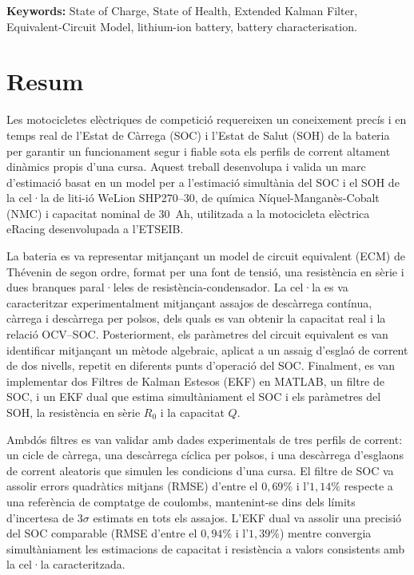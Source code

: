 \begin{sloppy}
\vspace{1em}
\noindent\textbf{Keywords:} State of Charge, State of Health, Extended Kalman Filter, 
Equivalent-Circuit Model, lithium-ion battery, battery characterisation.


\end{sloppy}

\chapter*{Resum}
Les motocicletes elèctriques de competició requereixen un coneixement precís i en 
temps real de l'Estat de Càrrega (SOC) i l'Estat de Salut (SOH) de la bateria per 
garantir un funcionament segur i fiable sota els perfils de corrent altament dinàmics 
propis d'una cursa. Aquest treball desenvolupa i valida un marc d'estimació basat en un 
model per a l'estimació simultània del SOC i el SOH de la cel·la de liti-ió WeLion 
SHP270--30, de química Níquel-Manganès-Cobalt (NMC) i capacitat nominal de 30~Ah, 
utilitzada a la motocicleta elèctrica eRacing desenvolupada a l'ETSEIB.

La bateria es va representar mitjançant un model de circuit equivalent (ECM) de 
Thévenin de segon ordre, format per una font de tensió, una resistència en sèrie i 
dues branques paral·leles de resistència-condensador. La cel·la es va caracteritzar 
experimentalment mitjançant assajos de descàrrega contínua, càrrega i descàrrega per polsos, 
dels quals es van obtenir la capacitat real i la relació OCV--SOC. Posteriorment, els 
paràmetres del circuit equivalent es van identificar mitjançant un mètode algebraic, 
aplicat a un assaig d'esglaó de corrent de dos nivells, repetit en diferents punts 
d'operació del SOC. Finalment, es van implementar dos Filtres de Kalman Estesos (EKF) 
en MATLAB, un filtre de SOC, i un EKF dual que estima simultàniament el SOC i els 
paràmetres del SOH, la resistència en sèrie $R_0$ i la capacitat $Q$.

Ambdós filtres es van validar amb dades experimentals de tres perfils de corrent: un 
cicle de càrrega, una descàrrega cíclica per polsos, i una descàrrega d'esglaons de 
corrent aleatoris que simulen les condicions d'una cursa. El filtre de SOC va assolir 
errors quadràtics mitjans (RMSE) d'entre el $0,69\%$ i l'$1,14\%$ respecte a una 
referència de comptatge de coulombs, mantenint-se dins dels límits d'incertesa de 
$3\sigma$ estimats en tots els assajos. L'EKF dual va assolir una precisió del SOC 
comparable (RMSE d'entre el $0,94\%$ i l'$1,39\%$) mentre convergia simultàniament 
les estimacions de capacitat i resistència a valors consistents amb la cel·la 
caracteritzada.

